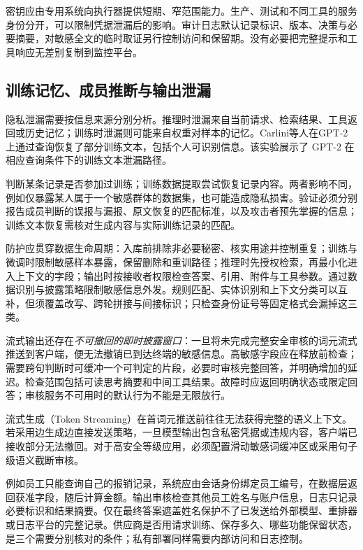 \documentclass[../textbook.tex]{subfiles}
\begin{document}
密钥应由专用系统向执行器提供短期、窄范围能力。生产、测试和不同工具的服务身份分开，可以限制凭据泄漏后的影响。审计日志默认记录标识、版本、决策与必要摘要，对敏感全文的临时取证另行控制访问和保留期。没有必要把完整提示和工具响应无差别复制到监控平台。

\subsection{训练记忆、成员推断与输出泄漏}
隐私泄漏需要按信息来源分别分析。推理时泄漏来自当前请求、检索结果、工具返回或历史记忆；训练时泄漏则可能来自权重对样本的记忆。Carlini等人在GPT-2上通过查询恢复了部分训练文本，包括个人可识别信息\cite{carlini2021trainingextraction}。该实验展示了 GPT-2 在相应查询条件下的训练文本泄漏路径。

判断某条记录是否参加过训练；训练数据提取尝试恢复记录内容。两者影响不同，例如仅暴露某人属于一个敏感群体的数据集，也可能造成隐私损害。验证必须分别报告成员判断的误报与漏报、原文恢复的匹配标准，以及攻击者预先掌握的信息；训练文本恢复需核对生成内容与实际训练记录的匹配。

防护应贯穿数据生命周期：入库前排除非必要秘密、核实用途并控制重复；训练与微调时限制敏感样本暴露，保留删除和重训路径；推理时先授权检索，再最小化进入上下文的字段；输出时按接收者权限检查答案、引用、附件与工具参数。通过数据识别与披露策略限制敏感信息外发。规则匹配、实体识别和上下文分类可以互补，但须覆盖改写、跨轮拼接与间接标识；只检查身份证号等固定格式会漏掉这三类。

流式输出还存在\emph{不可撤回的即时披露窗口}：一旦将未完成完整安全审核的词元流式推送到客户端，便无法撤销已到达终端的敏感信息。高敏感字段应在释放前检查；需要跨句判断时可缓冲一个可判定的片段，必要时审核完整回答，并明确增加的延迟。检查范围包括可读思考摘要和中间工具结果。故障时应返回明确状态或限定回答；审核服务不可用时的默认行为不能是无限放行。

\begin{warning}[流式输出的即时泄露与审核窗口]
流式生成（Token Streaming）在首词元推送前往往无法获得完整的语义上下文。若采用边生成边直接发送策略，一旦模型输出包含私密凭据或违规内容，客户端已接收部分无法撤回。对于高安全等级应用，必须配置滑动敏感词缓冲区或采用句子级语义截断审核。
\end{warning}

例如员工只能查询自己的报销记录，系统应由会话身份绑定员工编号，在数据层返回获准字段，随后计算金额。输出审核检查其他员工姓名与账户信息，日志只记录必要标识和结果摘要。仅在最终答案遮盖姓名保护不了已发送给外部模型、重排器或日志平台的完整记录。供应商是否用请求训练、保存多久、哪些功能保留状态，是三个需要分别核对的条件；私有部署同样需要内部访问和日志控制。
\end{document}
